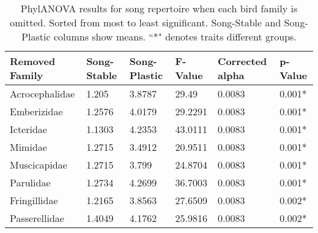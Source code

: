 \documentclass[a4paper,12pt]{article}
\begin{document}
\begin{table}[ht]
\caption{PhylANOVA results for song repertoire when each bird family is omitted.  Sorted from most to least significant.  Song-Stable and Song-Plastic columns show means.  ``*" denotes traits different groups.}
\centering
\begin{tabular}{llllll}
  \hline
Removed Family & Song-Stable & Song-Plastic & F-Value & Corrected alpha & p-Value \\ 
  \hline
Acrocephalidae & 1.205 & 3.8787 & 29.49 & 0.0083 & 0.001* \\ 
  Emberizidae & 1.2576 & 4.0179 & 29.2291 & 0.0083 & 0.001* \\ 
  Icteridae & 1.1303 & 4.2353 & 43.0111 & 0.0083 & 0.001* \\ 
  Mimidae & 1.2715 & 3.4912 & 20.9511 & 0.0083 & 0.001* \\ 
  Muscicapidae & 1.2715 & 3.799 & 24.8704 & 0.0083 & 0.001* \\ 
  Parulidae & 1.2734 & 4.2699 & 36.7003 & 0.0083 & 0.001* \\ 
  Fringillidae & 1.2165 & 3.8563 & 27.6509 & 0.0083 & 0.002* \\ 
  Passerellidae & 1.4049 & 4.1762 & 25.9816 & 0.0083 & 0.002* \\ 
   \hline
\end{tabular}
\end{table}
\end{document}
